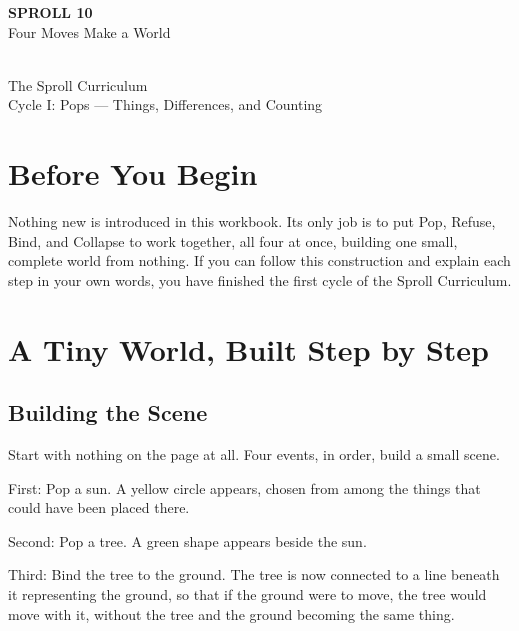 \documentclass[11pt]{book}
\begin{document}
\begin{titlepage}
\centering
\vspace*{1.4in}
{\Huge \textbf{SPROLL 10}}\\[0.5in]
{\huge Four Moves Make a World}\\[0.8in]
\\[0.8in]
{\Large The Sproll Curriculum}\\[0.2in]
{\large Cycle I: Pops --- Things, Differences, and Counting}
\end{titlepage}

\tableofcontents

\chapter*{Before You Begin}

Nothing new is introduced in this workbook. Its only job is to put Pop, Refuse, Bind, and Collapse to work together, all four at once, building one small, complete world from nothing. If you can follow this construction and explain each step in your own words, you have finished the first cycle of the Sproll Curriculum.

\chapter{A Tiny World, Built Step by Step}

\section{Building the Scene}

Start with nothing on the page at all. Four events, in order, build a small scene.

First: Pop a sun. A yellow circle appears, chosen from among the things that could have been placed there.

Second: Pop a tree. A green shape appears beside the sun.

Third: Bind the tree to the ground. The tree is now connected to a line beneath it representing the ground, so that if the ground were to move, the tree would move with it, without the tree and the ground becoming the same thing.
\end{document}
